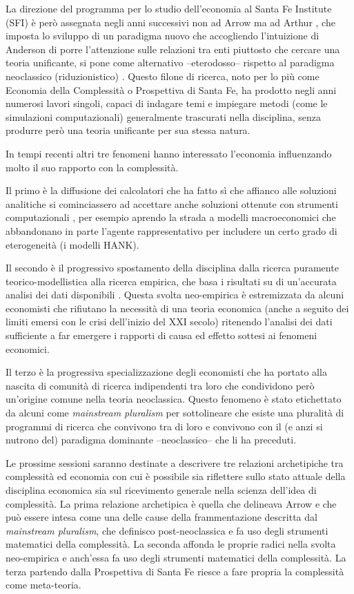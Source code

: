 \documentclass[a4paper, headings=standardclasses]{scrartcl}
\begin{document}
La direzione del programma per lo studio dell'economia al Santa Fe Institute (SFI) è però assegnata negli anni successivi non ad Arrow ma ad Arthur \parencite{fontana2010a}, che imposta lo sviluppo di un paradigma nuovo che accogliendo l'intuizione di Anderson di porre l'attenzione sulle relazioni tra enti piuttosto che cercare una teoria unificante, si pone come alternativo --eterodosso-- rispetto al paradigma neoclassico (riduzionistico) \parencite{arthur2021, fontana2010}.
Questo filone di ricerca, noto per lo più come Economia della Complessità o Prospettiva di Santa Fe, ha prodotto negli anni numerosi lavori singoli, capaci di indagare temi e impiegare metodi (come le simulazioni computazionali) generalmente trascurati nella disciplina, senza produrre però una teoria unificante per sua stessa natura.

In tempi recenti altri tre fenomeni hanno interessato l'economia influenzando molto il suo rapporto con la complessità.

Il primo è la diffusione dei calcolatori che ha fatto sì che affianco alle soluzioni analitiche si cominciassero ad accettare anche soluzioni ottenute con strumenti computazionali \parencite{cherrier2023, backhouse2016}, per esempio aprendo la strada a modelli macroeconomici che abbandonano in parte l'agente rappresentativo per includere un certo grado di eterogeneità (i modelli HANK).

Il secondo è il progressivo spostamento della disciplina dalla ricerca puramente teorico-model\-listica alla ricerca empirica, che basa i risultati su di un'accurata analisi dei dati disponibili \parencite{cherrier2018, backhouse2017}.
Questa svolta neo-empirica è estremizzata da alcuni economisti che rifiutano la necessità di una teoria economica (anche a seguito dei limiti emersi con le crisi dell'inizio del XXI secolo) ritenendo l'analisi dei dati sufficiente a far emergere i rapporti di causa ed effetto sottesi ai fenomeni economici.

Il terzo è la progressiva specializzazione degli economisti che ha portato alla nascita di comunità di ricerca indipendenti tra loro che condividono però un'origine comune nella teoria neoclassica. Questo fenomeno è stato etichettato da alcuni come \textit{mainstream pluralism} \parencite{cedrini2018, davis2006, davis2019a} per sottolineare che esiste una pluralità di programmi di ricerca che convivono tra di loro e convivono con il (e anzi si nutrono del) paradigma dominante --neoclassico-- che li ha preceduti.

Le prossime sessioni saranno destinate a descrivere tre relazioni archetipiche tra complessità ed economia con cui è possibile sia riflettere sullo stato attuale della disciplina economica sia sul ricevimento generale nella scienza dell'idea di complessità.
La prima relazione archetipica è quella che delineava Arrow e che può essere intesa come una delle cause della frammentazione descritta dal \textit{mainstream pluralism}, che definisco post-neoclassica e fa uso degli strumenti matematici della complessità.
La seconda affonda le proprie radici nella svolta neo-empirica e anch'essa fa uso degli strumenti matematici della complessità.
La terza partendo dalla Prospettiva di Santa Fe riesce a fare propria la complessità come meta-teoria.
\end{document}
